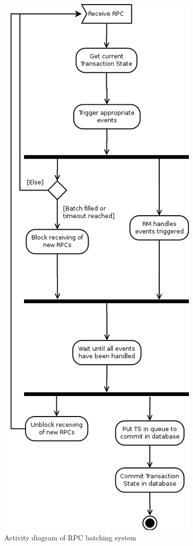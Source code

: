 \begin{figure}
\centering
\includegraphics[scale=0.4]{resources/images/Implementation/rpc_batch_system_activity.png}
\caption{Activity diagram of RPC batching system}
\label{fig:impl_rpc_batch_system}
\end{figure}


